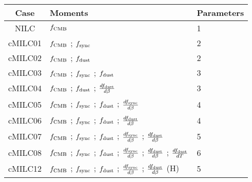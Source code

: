 \begin{tabular}{cll}
\toprule
    Case &                                                                                                                                               Moments &  Parameters \\
\midrule
 NILC &  $f_{\rm CMB}$ &  1 \\
 cMILC01 &  $f_{\rm CMB}$ ; $f_{\rm sync}$ &  2 \\
 cMILC02 &  $f_{\rm CMB}$ ; $f_{\rm dust}$ &  2 \\
 cMILC03 &  $f_{\rm CMB}$ ; $f_{\rm sync}$ ; $f_{\rm dust}$ &  3 \\
 cMILC04 &  $f_{\rm CMB}$ ; $f_{\rm dust}$ ; $\frac{d f_{\rm dust}}{d \beta}$ &  3 \\
 cMILC05 &  $f_{\rm CMB}$ ; $f_{\rm sync}$ ; $f_{\rm dust}$ ; $\frac{d f_{\rm sync}}{d \beta}$ &  4 \\
 cMILC06 &  $f_{\rm CMB}$ ; $f_{\rm sync}$ ; $f_{\rm dust}$ ; $\frac{d f_{\rm dust}}{d \beta}$ &  4 \\
 cMILC07 &  $f_{\rm CMB}$ ; $f_{\rm sync}$ ; $f_{\rm dust}$ ; $\frac{d f_{\rm sync}}{d \beta}$ ; $\frac{d f_{\rm dust}}{d \beta}$ &  5 \\
 cMILC08 &  $f_{\rm CMB}$ ; $f_{\rm sync}$ ; $f_{\rm dust}$ ; $\frac{d f_{\rm sync}}{d \beta}$ ; $\frac{d f_{\rm dust}}{d \beta}$ ; $\frac{d f_{\rm dust}}{d T}$ &  6 \\
 cMILC12 &  $f_{\rm CMB}$ ; $f_{\rm sync}$ ; $f_{\rm dust}$ ; $\frac{d f_{\rm sync}}{d \beta}$ ; $\frac{d f_{\rm dust}}{d \beta}$ (H) &  5 \\
\bottomrule
\end{tabular}
